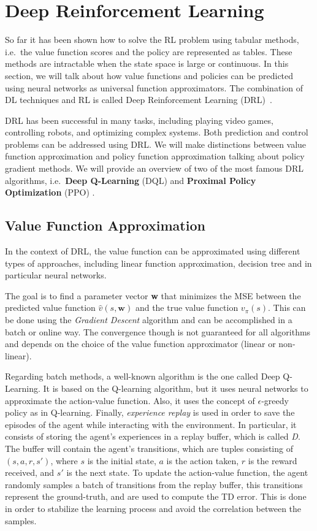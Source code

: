 \section{Deep Reinforcement Learning}
\label{sec:drl}
So far it has been shown how to solve the RL problem using tabular methods, i.e.\ the value function scores and the policy are represented as tables.
These methods are intractable when the state space is large or continuous.
In this section, we will talk about how value functions and policies can be predicted using neural networks as universal function approximators.
The combination of DL techniques and RL is called Deep Reinforcement Learning (DRL)~\citep{mnih2015human}.

DRL has been successful in many tasks, including playing video games, controlling robots, and optimizing complex systems.
Both prediction and control problems can be addressed using DRL\@.
We will make distinctions between value function approximation and policy function approximation talking about policy gradient methods. 
We will provide an overview of two of the most famous DRL algorithms, i.e.\ \textbf{Deep Q-Learning} (DQL) and \textbf{Proximal Policy Optimization} (PPO) \citep{schulman2017proximal}.


\subsection{Value Function Approximation}
\label{subsec:value_function_approx}
In the context of DRL, the value function can be approximated using different types of approaches, including linear function approximation, decision tree and in particular neural networks.

The goal is to find a parameter vector \textbf{w} that minimizes the MSE between the predicted value function $\hat{v}(s,\textbf{w})$ and the true value function $v_\pi(s)$.
This can be done using the \textit{Gradient Descent} algorithm and can be accomplished in a batch or online way.
The convergence though is not guaranteed for all algorithms and depends on the choice of the value function approximator (linear or non-linear).

Regarding batch methods, a well-known algorithm is the one called Deep Q-Learning.
It is based on the Q-learning algorithm, but it uses neural networks to approximate the action-value function.
Also, it uses the concept of $\epsilon$-greedy policy as in Q-learning.
Finally, \textit{experience replay} is used in order to save the episodes of the agent while interacting with the environment.
In particular, it consists of storing the agent's experiences in a replay buffer, which is called \textit{D}.
The buffer will contain the agent's transitions, which are tuples consisting of $(s, a, r, s')$, where $s$ is the initial state, $a$ is the action taken, $r$ is the reward received, and $s'$ is the next state.
To update the action-value function, the agent randomly samples a batch of transitions from the replay buffer, this transitions represent the ground-truth, and are used to compute the TD error.
This is done in order to stabilize the learning process and avoid the correlation between the samples.

